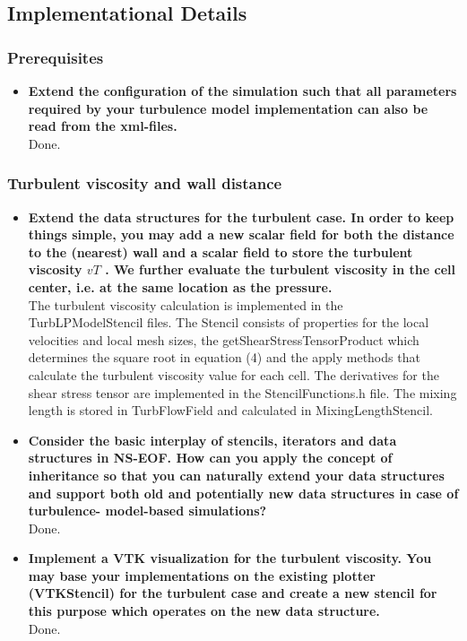 \documentclass[a4paper]{article}
\begin{document}
\subsection{Implementational Details}
\subsubsection{Prerequisites}
	\begin{itemize}
	\item \textbf{Extend the configuration of the simulation such that all parameters required by your turbulence model implementation can also be read from the xml-files.}\\
	Done.
\end{itemize}
\subsubsection{Turbulent viscosity and wall distance}
\begin{itemize}
	\item \textbf{Extend the data structures for the turbulent case. In order to keep things simple, you may add a new scalar field for both the distance to the (nearest) wall and a scalar field to store the turbulent viscosity $vT$ . We further evaluate the turbulent viscosity in the cell center, i.e. at the same location as the pressure.}\\
	The turbulent viscosity calculation is implemented in the TurbLPModelStencil files. The Stencil consists of properties for the local velocities and local mesh sizes, the getShearStressTensorProduct which determines the square root in equation (4) and the apply methods that calculate the  turbulent viscosity value for each cell. The derivatives for the shear stress tensor are implemented in the StencilFunctions.h file. The mixing length is stored in TurbFlowField and calculated in MixingLengthStencil. 
	\item \textbf{Consider the basic interplay of stencils, iterators and data structures in NS-EOF. How can you apply the concept of inheritance so that you can naturally extend your data structures and support both old and potentially new data structures in case of turbulence- model-based simulations?}\\
	Done.
	\item \textbf{Implement a VTK visualization for the turbulent viscosity. You may base your implementations on the existing plotter (VTKStencil) for the turbulent case and create a new stencil for this purpose which operates on the new data structure.}\\
	Done.
\end{itemize}
\end{document}
